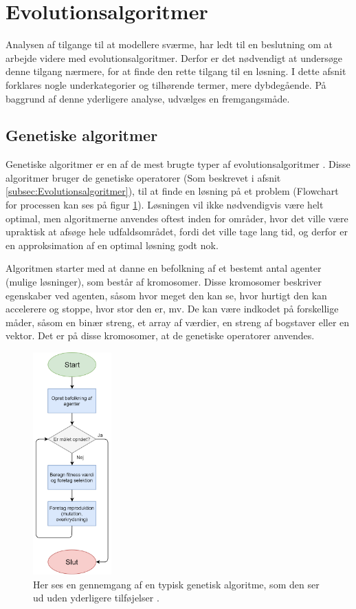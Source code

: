 \section{Evolutionsalgoritmer}
Analysen af tilgange til at modellere sværme, har ledt til en beslutning om at arbejde videre med evolutionsalgoritmer. Derfor er det nødvendigt at undersøge denne tilgang nærmere, for at finde den rette tilgang til en løsning. I dette afsnit forklares nogle underkategorier og tilhørende termer, mere dybdegående. På baggrund af denne yderligere analyse, udvælges en fremgangsmåde.
\todo[inline]{}

\subsection{Genetiske algoritmer} 
Genetiske algoritmer er en af de mest brugte typer af evolutionsalgoritmer  \citep{genetic-algorithms}\citep{evolutionary-computing}. Disse algoritmer bruger de genetiske operatorer (Som beskrevet i afsnit \ref{subsec:Evolutionsalgoritmer}), til at finde en løsning på et problem (Flowchart for processen kan ses på figur \ref{Genetisk algoritme}). Løsningen vil ikke nødvendigvis være helt optimal, men algoritmerne anvendes oftest inden for områder, hvor det ville være upraktisk at afsøge hele udfaldsområdet, fordi det ville tage lang tid, og derfor er en approksimation af en optimal løsning godt nok. 
\par
Algoritmen starter med at danne en befolkning af et bestemt antal agenter (mulige løsninger), som består af kromosomer. Disse kromosomer beskriver egenskaber ved agenten, såsom hvor meget den kan se, hvor hurtigt den kan accelerere og stoppe, hvor stor den er, mv. De kan være indkodet på forskellige måder, såsom en binær streng, et array af værdier, en streng af bogstaver eller en vektor. Det er på disse kromosomer, at de genetiske operatorer anvendes. 
\begin{figure}[H]
    \centering
    \includegraphics[width=0.27\textwidth]{figures/Genetisk_algoritme.png}
    \caption{Her ses en gennemgang af en typisk genetisk algoritme, som den ser ud uden yderligere tilføjelser \citep{evolutionary-computing}.}
    \label{Genetisk algoritme}
\end{figure}
